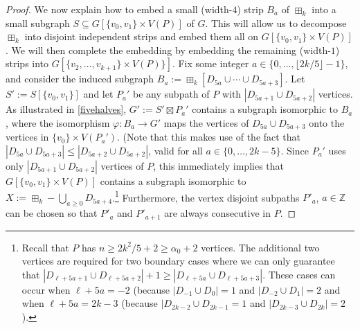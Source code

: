 \documentclass{patmorin}
\renewcommand{\ge}{\geqslant}
\renewcommand{\le}{\leqslant}
\theoremstyle{plain}
\theoremstyle{definition}
\begin{document}
\begin{proof}
  We now explain how to embed a small (width-$4$) strip $B_a$ of $\boxplus_k$ into a small subgraph $S\subseteq G[\{v_0,v_1\}\times V(P)]$ of $G$.  This will allow us to decompose $\boxplus_k$ into disjoint independent strips and embed them all on $G[\{v_0,v_1\}\times V(P)]$.  We will then complete the embedding by embedding the remaining (width-$1$) strips into $G[\{v_2,\ldots,v_{k+1}\}\times V(P)\}]$.  Fix some integer $a\in\{0,\ldots,\lfloor 2k/5\rfloor-1\}$, and consider the induced subgraph $B_a:=\boxplus_k[D_{5a}\cup\cdots \cup D_{5a+3}]$.  Let $S':=S[\{v_0,v_1\}]$ and let $P_a'$ be any  subpath of $P$ with $|D_{5a+1}\cup D_{5a+2}|$ vertices.  As illustrated in \cref{fivehalves}, $G':=S'\boxtimes P_a'$ contains a subgraph isomorphic to $B_a$, where the isomorphism $\varphi:B_a\to G'$ maps the vertices of $D_{5a}\cup D_{5a+3}$ onto the vertices in $\{v_0\}\times V(P_a')$.  (Note that this makes use of the fact that $|D_{5a}\cup D_{5a+3}|\le |D_{5a+2}\cup D_{5a+2}|$, valid for all $a\in\{0,\ldots,2k-5\}$.  Since $P_a'$ uses only $|D_{5a+1}\cup D_{5a+2}|$ vertices of $P$, this immediately implies that $G[\{v_0,v_1\}\times V(P)]$ contains a subgraph isomorphic to $X:=\boxplus_k-\bigcup_{a\ge 0}D_{5a+4}$.\footnote{Recall that $P$ has $n\ge 2k^2/5+2\ge \alpha_0+2$ vertices. The additional two vertices are required for two boundary cases where we can only guarantee that $|D_{\ell+5a+1}\cup D_{\ell+5a+2}|+1\ge |D_{\ell+5a}\cup D_{\ell+5a+3}|$.  These cases can occur when $\ell+5a=-2$ (because $|D_{-1}\cup D_0|=1$ and $|D_{-2}\cup D_{1}|=2$ and when $\ell+5a=2k-3$ (because $|D_{2k-2}\cup D_{2k-1}=1$ and $|D_{2k-3}\cup D_{2k}|=2$).} Furthermore, the vertex disjoint subpaths $P'_a$, $a\in \mathbb{Z}$ can be chosen so that $P'_a$ and $P'_{a+1}$ are always consecutive in $P$.
  

\end{proof}
\end{document}
